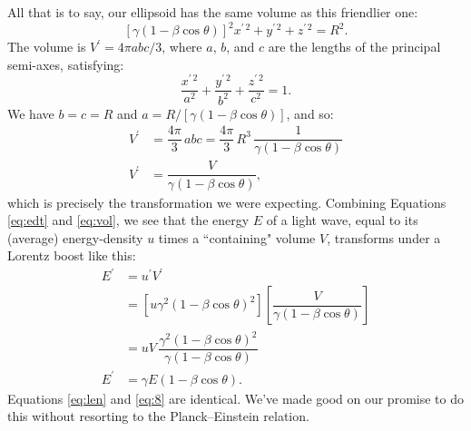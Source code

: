 \documentclass[12pt]{article}
\begin{document}
All that is to say, our ellipsoid has the same volume as this friendlier one:
\begin{equation*}
\left[ \gamma ( 1 - \beta \cos{\theta} ) \right]^2 x^{\prime \, 2} + y^{\prime \, 2} + z^{\prime \, 2} = R^2 .
\end{equation*}
The volume is $V^\prime = 4 \pi abc / 3$, where $a$, $b$, and $c$ are the lengths of the principal semi-axes, satisfying:
\begin{equation*}
\dfrac{x^{\prime \, 2}}{a^2} + \dfrac{y^{\prime \, 2}}{b^2} + \dfrac{z^{\prime \, 2}}{c^2} = 1 .
\end{equation*}
We have $b = c = R$ and $a = R / [\gamma ( 1 - \beta \cos{\theta} )]$, and so:
\begin{equation}\label{eq:vol}
\begin{split}
V^\prime &= \dfrac{4 \pi}{3} \, abc = \dfrac{4 \pi }{3} \, R^3 \, \dfrac{1}{\gamma ( 1 - \beta \cos{\theta} )} \\
V^\prime &= \dfrac{V}{\gamma ( 1 - \beta \cos{\theta} )} ,
\end{split}
\end{equation}
which is precisely the transformation we were expecting. Combining Equations \ref{eq:edt} and \ref{eq:vol}, we see that the energy $E$ of a light wave, equal to its (average) energy-density $u$ times a ``containing" volume $V$, transforms under a Lorentz boost like this:
\begin{equation}\label{eq:len}
\begin{split}
E^\prime &= u^\prime V^\prime \\
&= \left[ u \gamma^2 ( 1 - \beta \cos{\theta} )^2  \right] \left[ \dfrac{V}{\gamma ( 1 - \beta \cos{\theta} )} \right] \\[4pt]
&= uV \, \dfrac{\gamma^2 ( 1 - \beta \cos{\theta} )^2}{\gamma ( 1 - \beta \cos{\theta} )} \\[5pt]
E^\prime &= \gamma E ( 1 - \beta \cos{\theta} ) .
\end{split}
\end{equation}
Equations \ref{eq:len} and \ref{eq:8} are identical. We've made good on our promise to do this without resorting to the Planck--Einstein relation.
\end{document}
